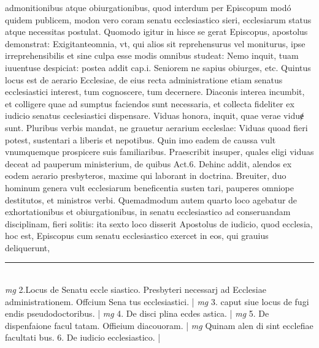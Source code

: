 \documentclass{article}
\begin{document}
\begin{pages}
admonitionibus atque  obiurgationibus, quod interdum per Episcopum modó quidem publicem, modon vero coram senatu ecclesiastico sieri, ecclesiarum status atque  necessitas postulat. Quomodo igitur in hisce se gerat Episcopus, apostolus demonstrat: Exigitanteomnia, vt, qui alios sit reprehensurus vel moniturus, ipse irreprehensibilis et sine culpa esse modis omnibus studeat: Nemo inquit, tuam iuuentuse despiciat: postea addit cap.i.   Seniorem ne sapius obiurges, etc.  \pend\pstart Quintus locus est de aerario Ecclesiae, de eius recta administratione etiam senatus ecclesiastici interest, tum cognoscere, tum decernere. Diaconis interea incumbit, et colligere quae ad sumptus faciendos sunt necessaria, et collecta fideliter ex iudicio senatus ceclesiastici dispensare. Viduas honora, inquit, quae verae viduɇ sunt. Pluribus verbis mandat, ne grauetur aerarium eccleslae: Viduas quoad fieri potest, sustentari a liberis et nepotibus. Quin imo eadem de caussa vult vnumquemque  prospicere suis familiaribus. Praescribit insuper, quales eligi viduas deceat ad pauperum ministerium, de quibus Act.6. Dehinc addit, alendos ex eodem aerario presbyteros, maxime qui laborant in doctrina. Breuiter, duo hominum genera vult ecclesiarum beneficentia susten tari, pauperes omniope destitutos, et ministros verbi. Quemadmodum autem quarto loco agebatur de exhortationibus et obiurgationibus, in senatu ecclesiastico ad conseruandam disciplinam, fieri solitis: ita sexto loco disserit Apostolus de iudicio, quod ecclesia, hoc est, Episcopus cum senatu ecclesiastico exercet in eos, qui grauius deliquerunt,  \pend
\vspace{0.5cm}\noindent
\vspace{0.2cm}\rule{1cm}{0.2pt}\\ 
\hspace{0.2cm}\textit{mg}
\footnotesize 2.Locus de Senatu eccle siastico. Presbyteri necessarj ad Ecclesiae administrationem. Offcium Sena tus ecclesiastici. 
\normalsize| 
\hspace{0.2cm}\textit{mg}
\footnotesize 3. caput siue locus de fugi endis pseudodoctoribus. 
\normalsize| 
\hspace{0.2cm}\textit{mg}
\footnotesize 4. De disci plina ecdes astica. 
\normalsize| 
\hspace{0.2cm}\textit{mg}
\footnotesize 5. De dispenfaione facul tatam. Offieium diacouoram. 
\normalsize| 
\hspace{0.2cm}\textit{mg}
\footnotesize Quinam alen di sint ecclefiae facultati bus. 6. De iudicio ecclesiastico. 
\normalsize| 

\end{pages}
\end{document}
